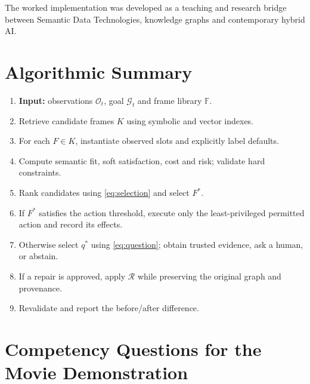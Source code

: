 \documentclass[11pt,a4paper]{article}
\newcommand{\Frames}{\mathbb{F}}
\newcommand{\Obs}{\mathcal{O}}
\newcommand{\Goals}{\mathcal{G}}
\newcommand{\Repair}{\mathcal{R}}
\begin{document}
The worked implementation was developed as a teaching and research bridge
between Semantic Data Technologies, knowledge graphs and contemporary hybrid AI.




\appendix

\section{Algorithmic Summary}

\begin{tcolorbox}[enhanced,breakable,colback=SoftGrey,colframe=ARUBlueGrey,
title={Algorithm 1: Adaptive-frame interpretation and repair},
coltitle=ARUNavy,fonttitle=\bfseries]
\begin{enumerate}
  \item \textbf{Input:} observations $\Obs_t$, goal $\Goals_t$ and frame library $\Frames$.
  \item Retrieve candidate frames $K$ using symbolic and vector indexes.
  \item For each $F\in K$, instantiate observed slots and explicitly label defaults.
  \item Compute semantic fit, soft satisfaction, cost and risk; validate hard constraints.
  \item Rank candidates using \cref{eq:selection} and select $F^*$.
  \item If $F^*$ satisfies the action threshold, execute only the least-privileged permitted action and record its effects.
  \item Otherwise select $q^*$ using \cref{eq:question}; obtain trusted evidence, ask a human, or abstain.
  \item If a repair is approved, apply $\Repair$ while preserving the original graph and provenance.
  \item Revalidate and report the before/after difference.
\end{enumerate}
\end{tcolorbox}

\section{Competency Questions for the Movie Demonstration}
\end{document}
